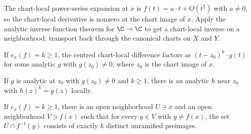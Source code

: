 \begin{proofsketch}
The chart-local power-series expansion at \(x\) is
\(f(t)=a\cdot t+O(t^2)\) with \(a\ne 0\), so the chart-local derivative
is nonzero at the chart image of \(x\). Apply the analytic inverse
function theorem for \(\C\to\C\) to get a chart-local inverse on a
neighborhood; transport back through the canonical charts on \(X\)
and \(Y\).
\end{proofsketch}

\begin{lemma}
\label{lem:chart-local-pow-mul}
If \(e_x(f)=k\ge 1\), the centred chart-local difference factors as
\((t-z_0)^k\cdot g(t)\) for some analytic \(g\) with \(g(z_0)\ne 0\),
where \(z_0\) is the chart image of \(x\).
\leanok
\end{lemma}

\begin{lemma}
\label{lem:analytic-kth-root}
If \(g\) is analytic at \(z_0\) with \(g(z_0)\ne 0\) and \(k\ge 1\),
there is an analytic \(h\) near \(z_0\) with \(h(z)^k=g(z)\) locally.
\leanok
\end{lemma}

\begin{lemma}
\label{lem:local-kfold-ramified}
If \(e_x(f)=k\ge 1\), there is an open neighborhood \(U\ni x\) and an
open neighborhood \(V\ni f(x)\) such that for every \(y\in V\) with
\(y\ne f(x)\), the set \(U\cap f^{-1}(y)\) consists of exactly \(k\)
distinct unramified preimages.
\notready
\end{lemma}

